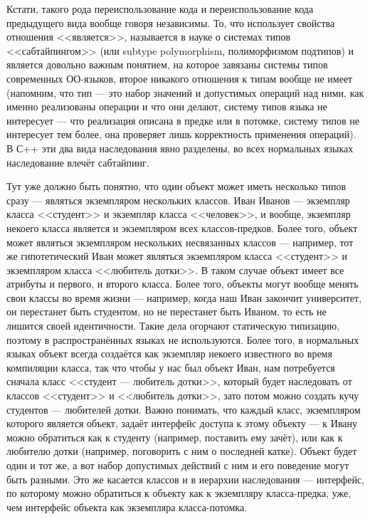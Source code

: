 \documentclass{../../text-style}
\begin{document}
Кстати, такого рода переиспользование кода и переиспользование кода предыдущего вида вообще говоря независимы. То, что использует свойства отношения <<является>>, называется в науке о системах типов <<сабтайпингом>> (или subtype polymorphism, полиморфизмом подтипов) и является довольно важным понятием, на которое завязаны системы типов современных ОО-языков, второе никакого отношения к типам вообще не имеет (напомним, что тип --- это набор значений и допустимых операций над ними, как именно реализованы операции и что они делают, систему типов языка не интересует --- что реализация описана в предке или в потомке, систему типов не интересует тем более, она проверяет лишь корректность применения операций). В С++ эти два вида наследования явно разделены, во всех нормальных языках наследование влечёт сабтайпинг.

Тут уже должно быть понятно, что один объект может иметь несколько типов сразу --- являться экземпляром нескольких классов. Иван Иванов --- экземпляр класса <<студент>> и экземпляр класса <<человек>>, и вообще, экземпляр некоего класса является и экземпляром всех классов-предков. Более того, объект может являться экземпляром нескольких несвязанных классов --- например, тот же гипотетический Иван может являться экземпляром класса <<студент>> и экземпляром класса <<любитель дотки>>. В таком случае объект имеет все атрибуты и первого, и второго класса. Более того, объекты могут вообще менять свои классы во время жизни --- например, когда наш Иван закончит университет, он перестанет быть студентом, но не перестанет быть Иваном, то есть не лишится своей идентичности. Такие дела огорчают статическую типизацию, поэтому в распространённых языках не используются. Более того, в нормальных языках объект всегда создаётся как экземпляр некоего известного во время компиляции класса, так что чтобы у нас был объект Иван, нам потребуется сначала класс <<студент --- любитель дотки>>, который будет наследовать от классов <<студент>> и <<любитель дотки>>, зато потом можно создать кучу студентов --- любителей дотки. Важно понимать, что каждый класс, экземпляром которого является объект, задаёт интерфейс доступа к этому объекту --- к Ивану можно обратиться как к студенту (например, поставить ему зачёт), или как к любителю дотки (например, поговорить с ним о последней катке). Объект будет один и тот же, а вот набор допустимых действий с ним и его поведение могут быть разными. Это же касается классов и в иерархии наследования --- интерфейс, по которому можно обратиться к объекту как к экземпляру класса-предка, уже, чем интерфейс объекта как экземпляра класса-потомка.
\end{document}
